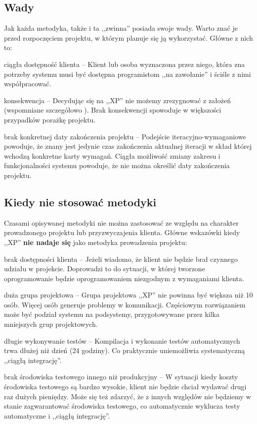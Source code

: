 \subsection{Wady}
\label{sec:ZMTOwady}

Jak każda metodyka, także i ta ,,zwinna'' posiada swoje wady. Warto znać je przed rozpoczęciem projektu, w którym planuje się ją wykorzystać. Główne z nich to:

\begin{packed_item}
    \item ciągła dostępność klienta -- Klient lub osoba wyznaczona przez niego, która zna potrzeby systemu musi być dostępna programistom ,,na zawołanie'' i ściśle z nimi współpracować.
    \item konsekwencja -- Decydując się na ,,XP'' nie możemy zrezygnować z założeń (wspomniane szczegółowo ). Brak konsekwencji spowoduje w większości przypadków porażkę projektu.
    \item brak konkretnej daty zakończenia projektu -- Podejście iteracyjno-wymaganiowe powoduje, że znany jest jedynie czas zakończenia aktualnej iteracji w skład której wchodzą konkretne karty wymagań. Ciągła możliwość zmiany zakresu i funkcjonalności systemu powoduje, że nie można określić daty zakończenia projektu.
\end{packed_item}

\subsection{Kiedy nie stosować metodyki}
\label{sec:ZMTOknsm}

Czasami opisywanej metodyki nie można zastosować ze względu na charakter prowadzonego projektu lub przyzwyczajenia klienta. Główne wskazówki kiedy ,,XP'' \textbf{nie nadaje się} jako metodyka prowadzenia projektu:

\begin{packed_item}
    \item brak dostępności klienta -- Jeżeli wiadomo, że klient nie będzie brał czynnego udziału w projekcie. Doprowadzi to do sytuacji, w której tworzone oprogramowanie będzie oprogramowaniem niezgodnym z wymaganiami klienta.
    \item duża grupa projektowa -- Grupa projektowa ,,XP'' nie powinna być większa niż 10 osób. Więcej osób generuje problemy w komunikacji. Częściowym rozwiązaniem może być podział systemu na podsystemy, przygotowywane przez kilka mniejszych grup projektowych.
    \item długie wykonywanie testów -- Kompilacja i wykonanie testów automatycznych trwa dłużej niż dzień (24 godziny). Co praktycznie uniemożliwia systematyczną ,,ciągłą integrację''.
    \item brak środowiska testowego innego niż produkcyjny -- W sytuacji kiedy koszty środowiska testowego są bardzo wysokie, klient nie będzie chciał wydawać drugi raz dużych pieniędzy. Może się też zdarzyć, że z innych względów nie będziemy w stanie zagwarantować środowiska testowego, co automatycznie wyklucza testy automatyczne i ,,ciągłą integrację''.
\end{packed_item}

